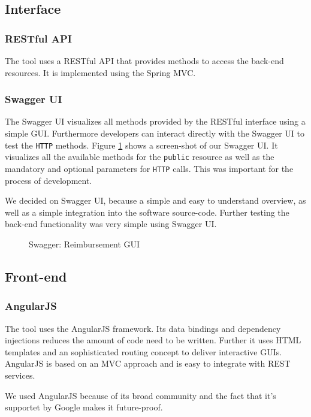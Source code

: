 \subsection{Interface}

\subsubsection{RESTful API}
\label{sec:restfulapi}
The tool uses a RESTful API that provides methods to access the back-end resources. It is implemented using the Spring MVC. 

\subsubsection{Swagger UI}
The Swagger UI visualizes all methods provided by the RESTful interface using a simple GUI. Furthermore developers can interact directly with the Swagger UI to test the \texttt{HTTP} methods. Figure \ref{fig:swagger01} shows a screen-shot of our Swagger UI. It visualizes all the available methods for the \texttt{public} resource as well as the mandatory and optional parameters for \texttt{HTTP} calls. This was important for the process of development. \cite{swagger} \par
We decided on Swagger UI, because a simple and easy to understand overview, as well as a simple integration into the software source-code. Further testing the back-end functionality was very simple using Swagger UI. 

\begin{figure}[H]
    \centering
    \caption{Swagger: Reimbursement GUI}
    \label{fig:swagger01}
\end{figure}

\subsection{Front-end}

\subsubsection{AngularJS}
The tool uses the AngularJS framework. Its data bindings and dependency injections reduces the amount of code need to be written. Further it uses HTML templates and an sophisticated routing concept to deliver interactive GUIs. AngularJS is based on an MVC approach and is easy to integrate with REST services.\cite{angular}\par
We used AngularJS because of its broad community and the fact that it's supportet by Google makes it future-proof. 

